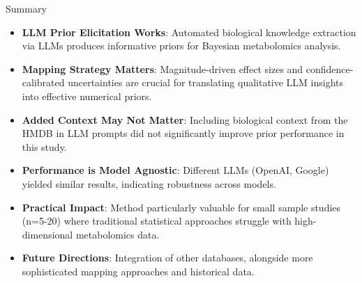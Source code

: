 \documentclass[
  ignorenonframetext,
  aspectratio=169,
]{beamer}
\providecommand{\tightlist}{%
  \setlength{\itemsep}{0pt}\setlength{\parskip}{0pt}}
\begin{document}
\begin{frame}{Summary}
\label{summary}
\begin{itemize}
\tightlist
\item
  \textbf{LLM Prior Elicitation Works}: Automated biological knowledge
  extraction via LLMs produces informative priors for Bayesian
  metabolomics analysis.
\item
  \textbf{Mapping Strategy Matters}: Magnitude-driven effect sizes and
  confidence-calibrated uncertainties are crucial for translating
  qualitative LLM insights into effective numerical priors.
\item
  \textbf{Added Context May Not Matter}: Including biological context
  from the HMDB in LLM prompts did not significantly improve prior
  performance in this study.
\item
  \textbf{Performance is Model Agnostic}: Different LLMs (OpenAI,
  Google) yielded similar results, indicating robustness across models.
\item
  \textbf{Practical Impact}: Method particularly valuable for small
  sample studies (n=5-20) where traditional statistical approaches
  struggle with high-dimensional metabolomics data.
\item
  \textbf{Future Directions}: Integration of other databases, alongside
  more sophisticated mapping approaches and historical data.
\end{itemize}
\end{frame}
\end{document}
